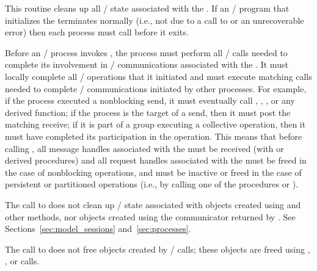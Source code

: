 This routine cleans up all \MPI/ state associated with the \wpm{}.
If an \MPI/ program that initializes the \wpm{} terminates normally (i.e., not due to a call to
 or an unrecoverable error) then each process must
call  before it exits.


Before  an \MPI/ process invokes , the process must
perform all \MPI/ calls needed to complete its
involvement in \MPI/ communications associated with the \wpm{}.
It must locally complete all
\MPI/ operations that it initiated and must execute matching calls needed to complete \MPI/
communications initiated by other processes.
For example, if the process executed a nonblocking send, it must
eventually call , ,
, or any derived function; if the process
is the target of a send, then it must post
the matching receive; if it is part of a group executing a collective
operation, then it must have completed its participation in the
operation.
This means that before calling , all message handles associated
with the \wpm{} must be received
(with  or derived procedures)
and all request handles associated with the \wpm{} must be freed
in the case of nonblocking operations,
and must be inactive or freed in the case of persistent or partitioned operations
(i.e., by calling one of the procedures
%
%
%
%
%
%
%
%
or ).

The call to  does not clean up \MPI/ state associated with objects
created using  and other \spm{} methods, nor objects created using the communicator returned by .  See Sections~\ref{sec:model_sessions} and~\ref{sec:processes}.

The call to  does not free objects created by
\MPI/ calls; these objects are freed using
%
%
%
%
%
%
%
%
,
, or
 calls.

